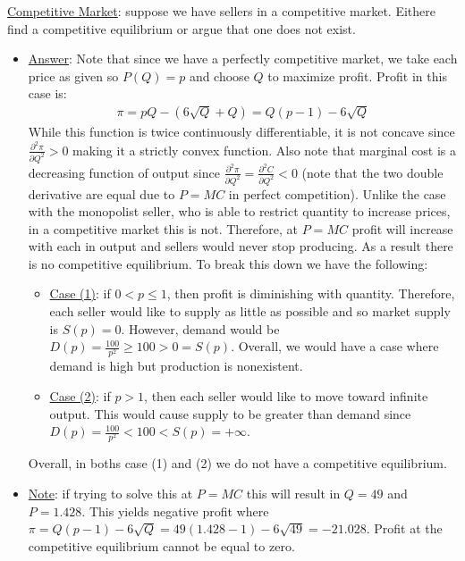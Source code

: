 \documentclass{article}
\begin{document}
  \par
  \underline{Competitive Market}: suppose we have sellers in a competitive market. Eithere find a competitive equilibrium or argue that one does not exist.
  \begin{itemize}
    \item  \underline{Answer}: Note that since we have a perfectly competitive market, we take each price as given so $P(Q) = p$ and choose $Q$ to maximize profit. Profit in this case is:
    \begin{gather*}
      \pi = pQ - (6\sqrt{Q} + Q) = Q(p-1) - 6\sqrt{Q}
    \end{gather*}
    While this function is twice continuously differentiable, it is not concave since $\tfrac{\partial^{2}\pi}{\partial Q^{2}} > 0$ making it a strictly convex function. Also note that marginal cost is a decreasing function of output since $\tfrac{\partial^{2}\pi}{\partial Q^{2}} = \tfrac{\partial^{2}C}{\partial Q^{2}} < 0$ (note that the two double derivative are equal due to $P=MC$ in perfect competition). Unlike the case with the monopolist seller, who is able to restrict quantity to increase prices, in a competitive market this is not. Therefore, at $P = MC$ profit will increase with each in output and sellers would never stop producing. As a result there is no competitive equilibrium. To break this down we have the following:
    \begin{itemize}
      \item  \underline{Case (1)}: if $0 < p \leq 1$, then profit is diminishing with quantity. Therefore, each seller would like to supply as little as possible and so market supply is $S(p) = 0$. However, demand would be $D(p) = \tfrac{100}{p^{2}} \geq 100 > 0 = S(p)$. Overall, we would have a case where demand is high but production is nonexistent.
      \item  \underline{Case (2)}: if $p > 1$, then each seller would like to move toward infinite output. This would cause supply to be greater than demand since $D(p) = \tfrac{100}{p^{2}} < 100 < S(p) = +\infty$.
    \end{itemize}
    Overall, in boths case (1) and (2) we do not have a competitive equilibrium.
    \item  \underline{Note}: if trying to solve this at $P=MC$ this will result in $Q=49$ and $P = 1.428$. This yields negative profit where $\pi = Q(p-1) - 6\sqrt{Q} = 49(1.428 - 1) - 6\sqrt{49} = -21.028$. Profit at the competitive equilibrium cannot be equal to zero.
  \end{itemize}
  \par
\vspace{6mm}
\end{document}
